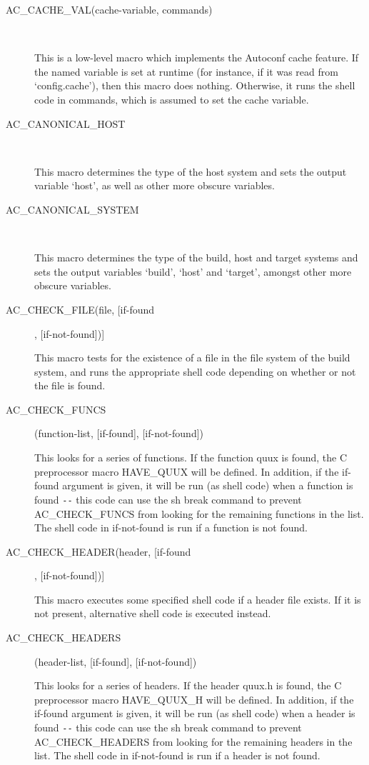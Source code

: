 \begin{description}
\item[AC\_{}CACHE\_{}VAL(cache-variable, commands)]
\

    This is a low-level macro which implements the Autoconf cache feature. If the named variable is set at runtime (for instance, if it was read from `config.cache'), then this macro does nothing. Otherwise, it runs the shell code in commands, which is assumed to set the cache variable.

\item[AC\_{}CANONICAL\_{}HOST]
\

    This macro determines the type of the host system and sets the output variable `host', as well as other more obscure variables.

\item[AC\_{}CANONICAL\_{}SYSTEM]
\

    This macro determines the type of the build, host and target systems and sets the output variables `build', `host' and `target', amongst other more obscure variables.

\item[AC\_{}CHECK\_{}FILE(file, [if-found], [if-not-found])]
\

    This macro tests for the existence of a file in the file system of the build system, and runs the appropriate shell code depending on whether or not the file is found.

\item[AC\_{}CHECK\_{}FUNCS](function-list, [if-found], [if-not-found])

    This looks for a series of functions. If the function quux is found, the C preprocessor macro HAVE\_{}QUUX will be defined. In addition, if the if-found argument is given, it will be run (as shell code) when a function is found \verb+--+ this code can use the sh break command to prevent AC\_{}CHECK\_{}FUNCS from looking for the remaining functions in the list. The shell code in if-not-found is run if a function is not found.

\item[AC\_{}CHECK\_{}HEADER(header, [if-found], [if-not-found])]
\

    This macro executes some specified shell code if a header file exists. If it is not present, alternative shell code is executed instead.

\item[AC\_{}CHECK\_{}HEADERS](header-list, [if-found], [if-not-found])

    This looks for a series of headers. If the header quux.h is found, the C preprocessor macro HAVE\_{}QUUX\_{}H will be defined. In addition, if the if-found argument is given, it will be run (as shell code) when a header is found \verb+--+ this code can use the sh break command to prevent AC\_{}CHECK\_{}HEADERS from looking for the remaining headers in the list. The shell code in if-not-found is run if a header is not found.


\end{description}
